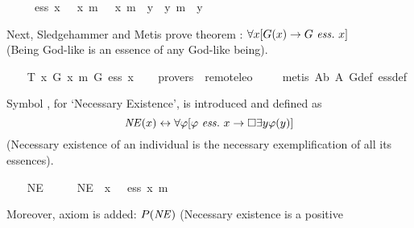 \begin{isabellebody}
\ \ \ \ {\isachardoublequoteopen}{\isasymphi}\ ess\ x\ {\isacharequal}\ {\isasymphi}\ x\ m{\isasymand}\ {\isasymforall}{\isacharparenleft}{\isasymlambda}{\isasympsi}{\isachardot}\ {\isasympsi}\ x\ m{\isasymrightarrow}\ {\isasymbox}\ {\isacharparenleft}{\isasymforall}{\isacharparenleft}{\isasymlambda}y{\isachardot}\ {\isasymphi}\ y\ m{\isasymrightarrow}\ {\isasympsi}\ y{\isacharparenright}{\isacharparenright}{\isacharparenright}{\isachardoublequoteclose}%
\begin{isamarkuptext}%
Next, Sledgehammer and Metis prove theorem : $\forall x [G(x) \rightarrow G \ \mathit{ess.} \ x]$ \\
(Being God-like is an essence of any God-like being).%
\end{isamarkuptext}%
\isamarkuptrue%
\ \ \isamarkupfalse%
\ T{}{\isacharcolon}\ {\isachardoublequoteopen}{\isacharbrackleft}{\isasymforall}{\isacharparenleft}{\isasymlambda}x{\isachardot}\ G\ x\ m{\isasymrightarrow}\ G\ ess\ x{\isacharparenright}{\isacharbrackright}{\isachardoublequoteclose}\isanewline
\ \ \isamarkupfalse%
\ {\isacharbrackleft}provers\ {\isacharequal}\ remote{\isacharunderscore}leo{}{\isacharbrackright}\ \isanewline
%
\isadelimproof
\ \ %
\endisadelimproof
%
\isatagproof
{}\isamarkupfalse%
\ {\isacharparenleft}metis\ A{}b\ A{}\ G{\isacharunderscore}def\ ess{\isacharunderscore}def{\isacharparenright}%
\endisatagproof
{\isafoldproof}%
%
\isadelimproof
%
\endisadelimproof
%
\begin{isamarkuptext}%
Symbol , for `Necessary Existence', is introduced and
defined as $$\mathit{NE}(x) \leftrightarrow \forall \varphi [\varphi \ \mathit{ess.} \ x \rightarrow \Box \exists y \varphi(y)]$$ (Necessary 
existence of an individual is the necessary exemplification of all its essences).%
\end{isamarkuptext}%
\isamarkuptrue%
\ \ \isamarkupfalse%
\ NE\ {\isacharcolon}{\isacharcolon}\ {\isachardoublequoteopen}{\isasymmu}\ {\isasymRightarrow}\ {\isasymsigma}{\isachardoublequoteclose}\ \ {\isachardoublequoteopen}NE\ {\isacharequal}\ {\isacharparenleft}{\isasymlambda}x{\isachardot}\ {\isasymforall}{\isacharparenleft}{\isasymlambda}{\isasymphi}{\isachardot}\ {\isasymphi}\ ess\ x\ m{\isasymrightarrow}\ {\isasymbox}\ {\isacharparenleft}{\isasymexists}\ {\isasymphi}{\isacharparenright}{\isacharparenright}{\isacharparenright}{\isachardoublequoteclose}%
\begin{isamarkuptext}%
Moreover, axiom  is added: $P(\mathit{NE})$ (Necessary existence is a positive 

\end{isamarkuptext}
\end{isabellebody}
